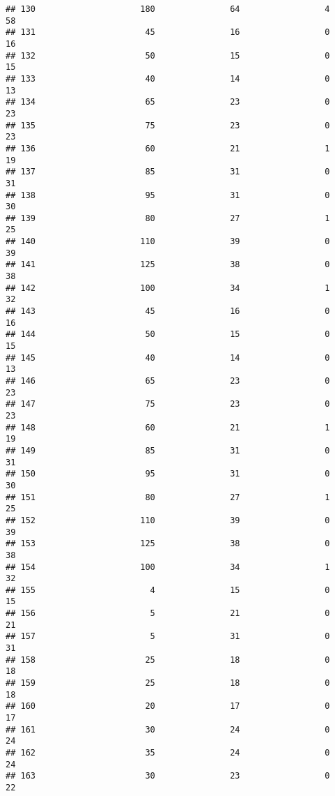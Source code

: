 \documentclass[
]{article}
\begin{document}
\begin{verbatim}
## 130                     180               64                 4         58
## 131                      45               16                 0         16
## 132                      50               15                 0         15
## 133                      40               14                 0         13
## 134                      65               23                 0         23
## 135                      75               23                 0         23
## 136                      60               21                 1         19
## 137                      85               31                 0         31
## 138                      95               31                 0         30
## 139                      80               27                 1         25
## 140                     110               39                 0         39
## 141                     125               38                 0         38
## 142                     100               34                 1         32
## 143                      45               16                 0         16
## 144                      50               15                 0         15
## 145                      40               14                 0         13
## 146                      65               23                 0         23
## 147                      75               23                 0         23
## 148                      60               21                 1         19
## 149                      85               31                 0         31
## 150                      95               31                 0         30
## 151                      80               27                 1         25
## 152                     110               39                 0         39
## 153                     125               38                 0         38
## 154                     100               34                 1         32
## 155                       4               15                 0         15
## 156                       5               21                 0         21
## 157                       5               31                 0         31
## 158                      25               18                 0         18
## 159                      25               18                 0         18
## 160                      20               17                 0         17
## 161                      30               24                 0         24
## 162                      35               24                 0         24
## 163                      30               23                 0         22

\end{verbatim}
\end{document}
